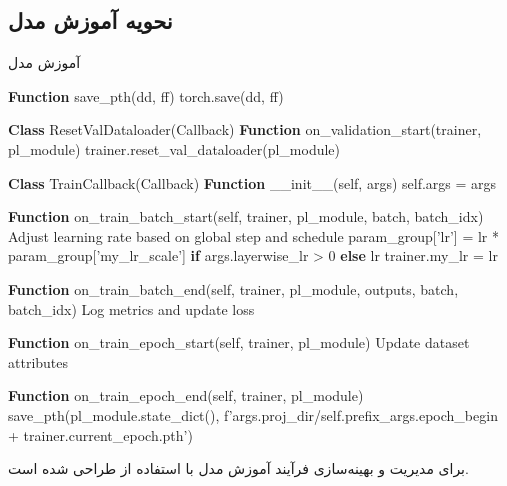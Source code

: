 \subsection{نحویه آموزش مدل}
\begin{LTR}

      \begin{algorithm}
            \caption{آموزش مدل}
            \label{alg:Training}
            \setmainfont{Times New Roman}
            \begin{algorithmic}[1]
                  \State \textbf{Function} save\_pth(dd, ff)
                  \State torch.save(dd, ff)

                  \State \textbf{Class} ResetValDataloader(Callback)
                  \State \textbf{Function} on\_validation\_start(trainer, pl\_module)
                  \State trainer.reset\_val\_dataloader(pl\_module)

                  \State \textbf{Class} TrainCallback(Callback)
                  \State \textbf{Function} \_\_init\_\_(self, args)
                  \State self.args = args

                  \State \textbf{Function} on\_train\_batch\_start(self, trainer, pl\_module, batch, batch\_idx)
                  \State Adjust learning rate based on global step and schedule
                  \State param\_group['lr'] = lr * param\_group['my\_lr\_scale'] \textbf{if} args.layerwise\_lr > 0 \textbf{else} lr
                  \EndFor
                  \State trainer.my\_lr = lr

                  \State \textbf{Function} on\_train\_batch\_end(self, trainer, pl\_module, outputs, batch, batch\_idx)
                  \State Log metrics and update loss

                  \State \textbf{Function} on\_train\_epoch\_start(self, trainer, pl\_module)
                  \State Update dataset attributes

                  \State \textbf{Function} on\_train\_epoch\_end(self, trainer, pl\_module)
                  \State save\_pth(pl\_module.state\_dict(), f'{args.proj\_dir}/{self.prefix}\_{args.epoch\_begin + trainer.current\_epoch}.pth')
                  \EndIf
            \end{algorithmic}
      \end{algorithm}
\end{LTR}
  برای مدیریت و بهینه‌سازی فرآیند آموزش  مدل
با استفاده از  \cite{Falcon_PyTorch_Lightning_2019}
طراحی شده است.

